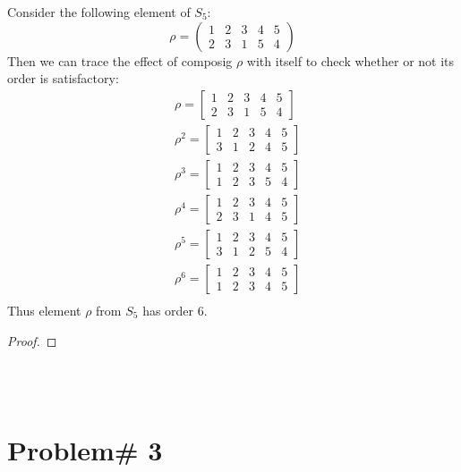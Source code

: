 \documentclass[11pt]{article}
\theoremstyle{definition}  %
\newcommand{\bigline}{\\\noindent\makebox[\linewidth]{\rule{\paperwidth}{0.4pt}}\\}
\begin{document}
\begin{itemize}
      Consider the following element of $S_5$:
      \[
      \rho= \left( \begin{array}{ccccc}
      1 & 2 & 3 & 4 & 5 \\
      2&3&1&5&4
      \end{array}\right)
      \]
      Then we can trace the effect of composig $\rho$ with itself to check whether or not its order is satisfactory:
      \begin{align*}
        &\rho=
        \begin{bmatrix}
        1 & 2 & 3 & 4 & 5 \\
        2&3&1&5&4
        \end{bmatrix}\\
        &\rho^2=
        \begin{bmatrix}
        1 & 2 & 3 & 4 & 5 \\
        3&1&2&4&5
        \end{bmatrix}\\
        &\rho^3=
        \begin{bmatrix}
        1 & 2 & 3 & 4 & 5 \\
        1&2&3&5&4
        \end{bmatrix}\\
        &\rho^4=
        \begin{bmatrix}
        1 & 2 & 3 & 4 & 5 \\
        2&3&1&4&5
        \end{bmatrix}\\
        &\rho^5=
        \begin{bmatrix}
        1 & 2 & 3 & 4 & 5 \\
        3&1&2&5&4
        \end{bmatrix}\\
        &\rho^6=
        \begin{bmatrix}
        1 & 2 & 3 & 4 & 5 \\
        1 & 2 & 3 & 4 & 5
        \end{bmatrix}\\
      \end{align*}
      Thus element $\rho$ from $S_5$ has order 6.
  \end{itemize}
  \begin{proof}

  \end{proof}
  \bigline
\section* {Problem# 3}
\end{document}

